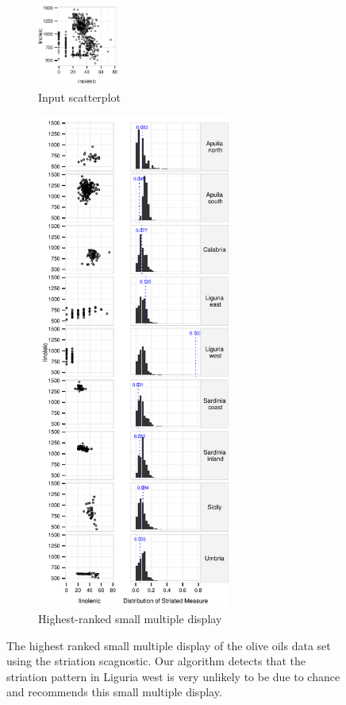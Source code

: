 \begin{figure}[t]
 \centering
    \begin{subfigure}{1.05in}
	\includegraphics[width=1.05in]{images/linolenic-linoleic.pdf}
	  \caption{Input scatterplot}
	 \label{fig:vrich_all}
    \end{subfigure}
    \begin{subfigure}{2.5in}
	\includegraphics[width=2.5in]{images/15_729035813077-region.pdf}
	  \caption{Highest-ranked small multiple display}
	 \label{fig:vrich_sm}
    \end{subfigure}
	\caption{The highest ranked small multiple display of the olive oils data set using the striation scagnostic. Our algorithm detects that the striation pattern in Liguria west is very unlikely to be due to chance and recommends this small multiple display. }
\end{figure}

